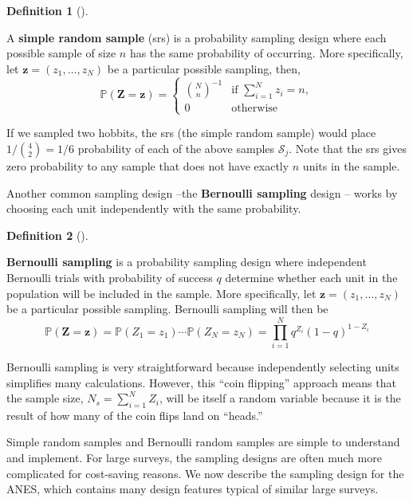 \documentclass[
  13pt,
  letterpaper,
  DIV=11,
  numbers=noendperiod]{scrreprt}
\newcommand{\mb}{\bm}
\renewcommand{\P}{\mathbb{P}}
\theoremstyle{plain}
\theoremstyle{plain}
\theoremstyle{definition}
\newtheorem{definition}{Definition}[chapter]
\theoremstyle{definition}
\theoremstyle{remark}
\begin{document}
\begin{definition}[]\protect\hypertarget{def-srs}{}\label{def-srs}

A \textbf{simple random sample} (srs) is a probability sampling design
where each possible sample of size \(n\) has the same probability of
occurring. More specifically, let \(\mb{z} = (z_{1}, \ldots, z_{N})\) be
a particular possible sampling, then, \[
\P(\mb{Z} = \mb{z}) = \begin{cases}
{N \choose n}^{-1} &\text{if } \sum_{i=1}^N z_i = n,\\
0 & \text{otherwise}
\end{cases}
\]

\end{definition}

If we sampled two hobbits, the srs (the simple random sample) would
place \(1/{4\choose 2} = 1/6\) probability of each of the above samples
\(\mathcal{S}_j\). Note that the srs gives zero probability to any
sample that does not have exactly \(n\) units in the sample.

Another common sampling design --the \textbf{Bernoulli sampling} design
-- works by choosing each unit independently with the same probability.

\begin{definition}[]\protect\hypertarget{def-bernoulli-sampling}{}\label{def-bernoulli-sampling}

\textbf{Bernoulli sampling} is a probability sampling design where
independent Bernoulli trials with probability of success \(q\) determine
whether each unit in the population will be included in the sample. More
specifically, let \(\mb{z} = (z_{1}, \ldots, z_{N})\) be a particular
possible sampling. Bernoulli sampling will then be \[
\P(\mb{Z} = \mb{z}) = \P(Z_1 = z_1) \cdots \P(Z_N = z_N) = \prod_{i=1}^N q^{Z_i}(1 - q)^{1-Z_i}
\]

\end{definition}

Bernoulli sampling is very straightforward because independently
selecting units simplifies many calculations. However, this ``coin
flipping'' approach means that the sample size,
\(N_s = \sum_{i=1}^N Z_i\), will be itself a random variable because it
is the result of how many of the coin flips land on ``heads.''

Simple random samples and Bernoulli random samples are simple to
understand and implement. For large surveys, the sampling designs are
often much more complicated for cost-saving reasons. We now describe the
sampling design for the ANES, which contains many design features
typical of similar large surveys.
\end{document}
